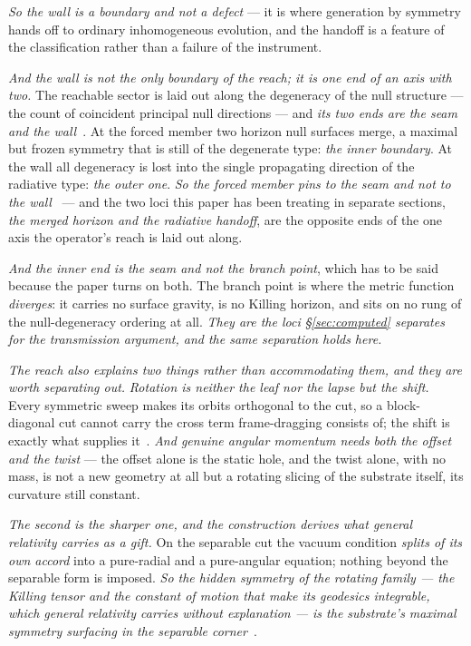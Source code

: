 \documentclass[11pt,a4paper]{article}
\theoremstyle{plain}
\theoremstyle{definition}
\begin{document}
\emph{So the wall is a boundary and not a defect} --- it is where generation by symmetry hands off to ordinary
inhomogeneous evolution, and the handoff is a feature of the classification rather than a failure of the
instrument.

\emph{And the wall is not the only boundary of the reach; it is one end of an axis with two.} The reachable
sector is laid out along the degeneracy of the null structure --- the count of coincident principal null
directions --- and \emph{its two ends are the seam and the wall}~\cite{JanzenRange}. At the forced member two
horizon null surfaces merge, a maximal but frozen symmetry that is still of the degenerate type: \emph{the
inner boundary}. At the wall all degeneracy is lost into the single propagating direction of the radiative
type: \emph{the outer one}. \emph{So the forced member pins to the seam and not to the wall}~\cite{JanzenRange} --- and the two loci this
paper has been treating in separate sections, \emph{the merged horizon and the radiative handoff}, are the
opposite ends of the one axis the operator's reach is laid out along.

\emph{And the inner end is the seam and not the branch point}, which has to be said because the paper turns
on both. The branch point is where the metric function \emph{diverges}: it carries no surface gravity, is no
Killing horizon, and sits on no rung of the null-degeneracy ordering at all. \emph{They are the loci
\S\ref{sec:computed} separates for the transmission argument, and the same separation holds here.}

\emph{The reach also explains two things rather than accommodating them, and they are worth separating
out.} \emph{Rotation is
neither the leaf nor the lapse but the shift.} Every symmetric sweep makes its orbits orthogonal to the cut,
so a block-diagonal cut cannot carry the cross term frame-dragging consists of; the shift is exactly what
supplies it~\cite{JanzenRange}. \emph{And genuine angular momentum needs both the offset and the twist} ---
the offset alone is the static hole, and the twist alone, with no mass, is not a new geometry at all but a
rotating slicing of the substrate itself, its curvature still constant.

\emph{The second is the sharper one, and the construction derives what general relativity carries as a
gift.} On the separable cut the vacuum condition \emph{splits of its own accord} into a pure-radial and a
pure-angular equation; nothing beyond the separable form is imposed. \emph{So the hidden symmetry of the
rotating family --- the Killing tensor and the constant of motion that make its geodesics integrable, which
general relativity carries without explanation --- is the substrate's maximal symmetry surfacing in the
separable corner}~\cite{JanzenRange}.
\end{document}
